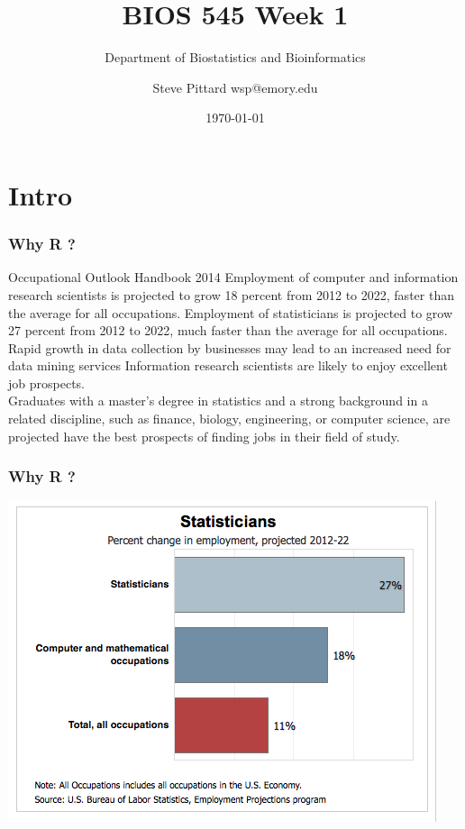 \documentclass{beamer}
\begin{document}


\title{BIOS 545 Week 1 }
\author{Steve Pittard wsp@emory.edu}
\subtitle{Department of Biostatistics and Bioinformatics}
\date{\today}

\maketitle


\section{Intro}

\begin{frame}[fragile]
\frametitle{Why R ? }
\begin{block}{Occupational Outlook Handbook 2014}
Employment of computer and information research scientists is projected to grow 18 percent from 2012 to 2022, faster than the average for all occupations. Employment of statisticians is projected to grow 27 percent from 2012 to 2022, much faster than the average for all occupations. 
\newline
\\
Rapid growth in data collection by businesses may lead to an increased need for data mining services
Information research scientists are likely to enjoy excellent job prospects. 
\newline
\\
Graduates with a master's degree in statistics and a strong background in a related discipline, such as finance, biology, engineering, or computer science, are projected have the best prospects of finding jobs in their field of study.
\end{block}
\end{frame}


\begin{frame}[fragile]
\frametitle{Why R ? }
\begin{center}
\includegraphics{../IMG/statmath.png}
\end{center}
\end{frame}
\end{document}
